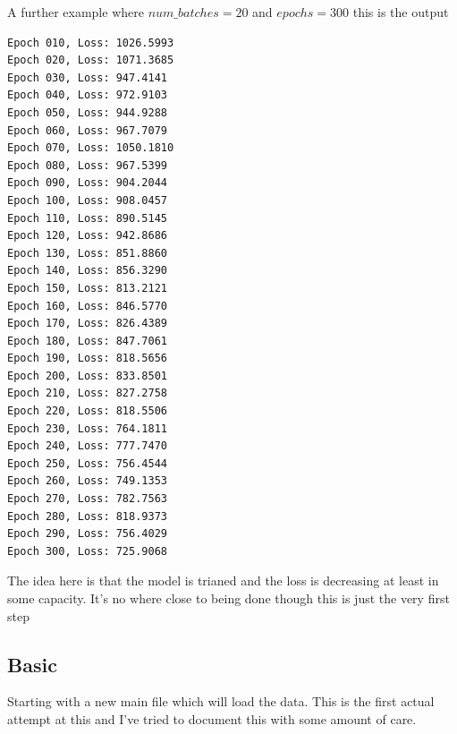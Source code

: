 A further example where $num\_batches = 20$ and $epochs = 300$
this is the output

\begin{lstlisting}[style=bashstyle,title={Initial output of results with larger batch and epochs},label={code:init_batch_results_1}]
Epoch 010, Loss: 1026.5993
Epoch 020, Loss: 1071.3685
Epoch 030, Loss: 947.4141
Epoch 040, Loss: 972.9103
Epoch 050, Loss: 944.9288
Epoch 060, Loss: 967.7079
Epoch 070, Loss: 1050.1810
Epoch 080, Loss: 967.5399
Epoch 090, Loss: 904.2044
Epoch 100, Loss: 908.0457
Epoch 110, Loss: 890.5145
Epoch 120, Loss: 942.8686
Epoch 130, Loss: 851.8860
Epoch 140, Loss: 856.3290
Epoch 150, Loss: 813.2121
Epoch 160, Loss: 846.5770
Epoch 170, Loss: 826.4389
Epoch 180, Loss: 847.7061
Epoch 190, Loss: 818.5656
Epoch 200, Loss: 833.8501
Epoch 210, Loss: 827.2758
Epoch 220, Loss: 818.5506
Epoch 230, Loss: 764.1811
Epoch 240, Loss: 777.7470
Epoch 250, Loss: 756.4544
Epoch 260, Loss: 749.1353
Epoch 270, Loss: 782.7563
Epoch 280, Loss: 818.9373
Epoch 290, Loss: 756.4029
Epoch 300, Loss: 725.9068
\end{lstlisting}

The idea here is that the model is trianed and the loss is decreasing at least
in some capacity. It's no where close to being done though this is just the
very first step

\subsection{Basic}

Starting with a new main file which will load the data. This is the first
actual attempt at this and I've tried to document this with some amount of
care.

